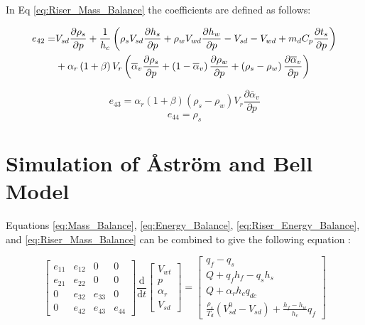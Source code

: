         In Eq \ref{eq:Riser_Mass_Balance} the coefficients are defined as follows:\cite{Astrom}

        
        \begin{equation*}
            \aligned
                e_{42} = & V_{sd}\frac{\partial \rho_s }{\partial p} + \frac{1}{h_c}\left ( \rho_s V_{sd} \frac{\partial h_s }{\partial p} + \rho_w V_{wd} \frac{\partial h_w }{\partial p} - V_{sd} - V_{wd} + m_d C_p \frac{\partial t_s }{\partial p} \right ) \\
                &+ \alpha_r\left ( 1+\beta \right )V_r \left ( \overline{\alpha}_v \frac{\partial \rho_s }{\partial p} + \left ( 1-\overline{\alpha}_v \right )\frac{\partial \rho_w }{\partial p} + \left ( \rho_s - \rho_w \right ) \frac{\partial \overline{\alpha}_v }{\partial p} \right )
            \endaligned
        \end{equation*}
        

        \begin{equation*}
            e_{43} = \alpha_r\left ( 1+\beta \right )\left ( \rho_s - \rho_w \right )V_r\frac{\partial \overline{\alpha}_v }{\partial p}
        \end{equation*}
        \begin{equation*}    
            e_{44} = \rho_s
        \end{equation*}

\section{Simulation of \r{A}str\"{o}m and Bell Model}
    
    Equations \ref{eq:Mass_Balance}, \ref{eq:Energy_Balance}, \ref{eq:Riser_Energy_Balance}, and  \ref{eq:Riser_Mass_Balance} can be combined to give the following equation :

    $$\left [ \begin{matrix}e_{11}& e_{12}& 0& 0 \\ e_{21}& e_{22}& 0& 0 \\ 0 & e_{32}& e_{33}& 0 \\ 0 & e_{42}& e_{43}& e_{44}\end{matrix} \right ] \frac{\mathrm{d} }{\mathrm{d} t} \left [ \begin{matrix} V_{wt}\\ p\\ \alpha_r\\ V_{sd}\end{matrix} \right ] = \left [ \begin{matrix} q_f  - q_s \\ Q + q_f h_f  - q_s h_s\\ Q + \alpha_r h_c q_{dc} \\ \frac{\rho_s}{T_d}  \left ( V_{sd}^0  - V_{sd}\right ) + \frac{h_f - h_w}{h_c}q_f \end{matrix} \right ]$$

